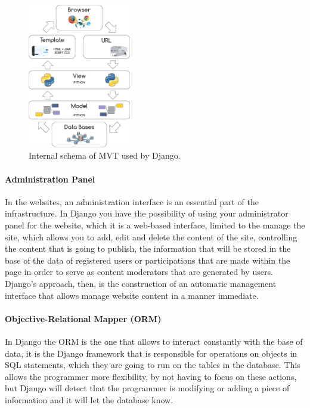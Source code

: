\documentclass[journal,transmag]{IEEEtran}
\begin{document}
\begin{figure}[t]
\centering
\includegraphics[width=0.4\textwidth]{diagrama_MVC.png}
\caption{Internal schema of MVT used by Django.}
\label{fig:esq_Django}
\end{figure}

\paragraph{Administration Panel}

In the websites, an administration interface is an essential part of the infrastructure. In Django you have the possibility of using your administrator panel for the website, which it is a web-based interface, limited to the manage the site, which allows you to add, edit and delete the content of the site, controlling the content that is going to publish, the information that will be stored in the base of the data of registered users or participations that are made within the page in order to serve as content moderators that are generated by users.
Django's approach, then, is the construction of an automatic management interface that allows manage website content in a manner immediate.

\paragraph{Objective-Relational Mapper (ORM)} 

In Django the ORM is the one that allows to interact constantly with the base of data, it is the Django framework that is responsible for operations on objects in SQL statements, which they are going to run on the tables in the database. This allows the programmer more flexibility, by not having to focus on these actions, but Django will detect that the programmer is modifying or adding a piece of information and it will let the database know.
\end{document}
